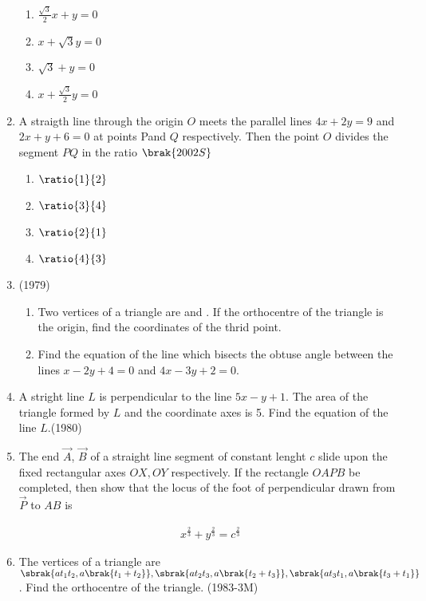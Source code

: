 \begin{enumerate}
\begin{enumerate}
        \item $\frac{\sqrt{3}}{2}x+y=0$
        \item $x+\sqrt{3}y=0$
        \item $\sqrt{3}+y=0$
        \item $x+\frac{\sqrt{3}}{2}y=0$
    
\end{enumerate}
\item A straigth line through the origin $O$ meets the parallel lines $4x+2y=9$ and $2x+y+6=0$ at points Pand $Q$ respectively. Then the point $O$ divides the segment $PQ$ in the ratio 
\hfill{$\brak{2002S}$}
\begin{enumerate}

     \item $\ratio{1}{2}$
     \item $\ratio{3}{4}$
     \item $\ratio{2}{1}$
     \item $\ratio{4}{3}$

\end{enumerate}
\item                    	\hfill{(1979)}
	\begin{enumerate}
             \item  Two vertices of a triangle are  and . If the orthocentre of the triangle is the origin, find the coordinates of the thrid point.
	     \item  Find the equation of the line which bisects the obtuse angle between  the lines $x-2y+4=0$ and $4x-3y+2=0$.
         \end{enumerate}

\item A stright line $L$ is perpendicular to the line $5x-y+1$. The area of the triangle formed by $L$ and the coordinate axes is 5. Find the equation of the line $L$.\hfill{(1980)}

\item The end $\vec{A}$, $\vec{B}$ of a straight line segment of constant lenght $c$ slide upon the fixed rectangular axes $ OX, OY$ respectively. If the rectangle $OAPB$ be completed, then show that the locus of the foot of perpendicular drawn from $\vec{P}$ to $AB$ is 

 \begin{align*}  x^\frac{2}{3} + y^\frac{2}{3} = c^\frac{2}{3} \end{align*}

  \item The vertices of a triangle are $\sbrak{ at_1t_2,a\brak{t_1+t_2}}, \sbrak{ at_2t_3,a\brak{t_2+t_3}},\sbrak{at_3t_1,a\brak{t_3+t_1}}$. Find the orthocentre of the triangle. \hfill{(1983-3M)}
	  

\end{enumerate}
